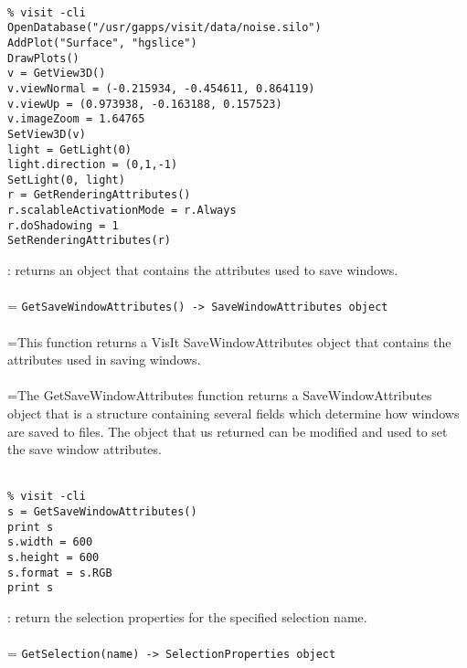 \documentclass[10pt,a4paper]{report}
\begin{document}
\\[-6mm]
\begin{verbatim}% visit -cli
OpenDatabase("/usr/gapps/visit/data/noise.silo")
AddPlot("Surface", "hgslice")
DrawPlots()
v = GetView3D()
v.viewNormal = (-0.215934, -0.454611, 0.864119)
v.viewUp = (0.973938, -0.163188, 0.157523)
v.imageZoom = 1.64765
SetView3D(v)
light = GetLight(0)
light.direction = (0,1,-1)
SetLight(0, light)
r = GetRenderingAttributes()
r.scalableActivationMode = r.Always
r.doShadowing = 1
SetRenderingAttributes(r)
\end{verbatim}
\newpage


{}
: returns an object that contains the attributes used to save windows.\\[-3mm]

 \\ 
\hangindent=\parindent 
\verb!GetSaveWindowAttributes() -> SaveWindowAttributes object!\\ [-3mm]

 \\ 
\hangindent=\parindent This function returns a VisIt SaveWindowAttributes object that contains the attributes used in saving windows. \\[-3mm] 

 \\ 
\hangindent=\parindent The GetSaveWindowAttributes function returns a SaveWindowAttributes object that is a structure containing several fields which determine how windows are saved to files. The object that us returned can be modified and used to set the save window attributes. \\[-3mm] 

\\[-6mm]
\begin{verbatim}% visit -cli
s = GetSaveWindowAttributes()
print s
s.width = 600
s.height = 600
s.format = s.RGB
print s
\end{verbatim}
\newpage


{}
: return the selection properties for the specified selection name.\\[-3mm]

 \\ 
\hangindent=\parindent 
\verb!GetSelection(name) -> SelectionProperties object!\\ [-3mm]
\end{document}
